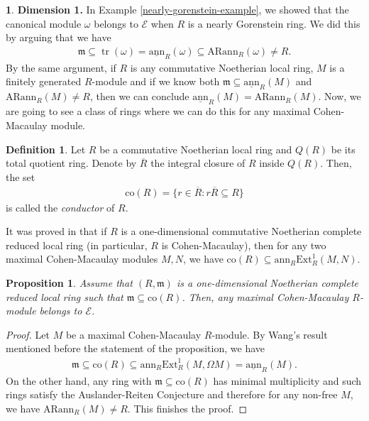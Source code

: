 \documentclass[12pt]{amsart}
\newcommand{\Ext}{\mathrm{Ext}}
\newcommand{\ann}{\mathrm{ann}}
\newcommand{\sann}{\underline{\mathrm{ann}}}
\newcommand{\arann}{\mathrm{ARann}}
\newcommand\co{\mathrm{co}}
\newcommand{\m}{\mathfrak{m}}
\newcommand{\EE}{\mathcal{E}}
\newtheorem{proposition}[theorem]{Proposition}
\theoremstyle{definition}
\newtheorem{definition}[theorem]{Definition}
\newtheorem{chunk}[theorem]{}
\numberwithin{equation}{theorem}
\DeclareMathOperator{\tr}{\mathrm{tr}}
\begin{document}
\begin{chunk}
    \textbf{Dimension 1.} In Example \ref{nearly-gorenstein-example}, we showed that the canonical module $\omega$ belongs to $\EE$ when $R$ is a nearly Gorenstein ring. We did this by arguing that we have 
    \begin{align*}
        \m \subseteq \tr(\omega) = \sann_R(\omega) \subseteq \arann_R(\omega) \neq R.
    \end{align*}
    By the same argument, if $R$ is any commutative Noetherian local ring, $M$ is a finitely generated $R$-module and if we know both $\m \subseteq \sann_R(M)$ and $\arann_R(M) \neq R$, then we can conclude $\sann_R(M) = \arann_R(M)$. Now, we are going to see a class of rings where we can do this for any maximal Cohen-Macaulay module.
    
    \begin{definition}
        Let $R$ be a commutative Noetherian local ring and $Q(R)$ be its total quotient ring. Denote by $\overline{R}$ the integral closure of $R$ inside $Q(R)$. Then, the set 
        \begin{align*}
            \co(R) = \{ r \in \overline{R} \colon r\overline{R} \subseteq R \}
        \end{align*}
    is called the \textit{conductor} of $R$.
    \end{definition}
    It was proved in \cite[Corollary 3.1]{Wang} that if $R$ is a one-dimensional commutative Noetherian complete reduced local ring (in particular, $R$ is Cohen-Macaulay), then for any two maximal Cohen-Macaulay modules $M,N$, we have $\co(R) \subseteq \ann_R\Ext_R^1(M,N)$. 
    \begin{proposition}\label{far-flung-Gorenstein-nearly}
        Assume that $(R, \m)$ is a one-dimensional Noetherian complete reduced local ring such that $\m \subseteq \co(R)$. Then, any maximal Cohen-Macaulay $R$-module belongs to $\EE$.
    \end{proposition}
    \begin{proof}
        Let $M$ be a maximal Cohen-Macaulay $R$-module. By Wang's result mentioned before the statement of the proposition, we have
        \begin{align*}
            \m \subseteq \co(R) \subseteq \ann_R \Ext_R^1(M, \Omega M) = \sann_R(M).
        \end{align*}
        On the other hand, any ring with $\m \subseteq \co(R)$ has minimal multiplicity \cite[Theorem 5.1]{goto-matsuoka-phuong} and such rings satisfy the Auslander-Reiten Conjecture \cite{Dey-Ghosh} and therefore for any non-free $M$, we have $\arann_R(M) \neq R$. This finishes the proof. 

\end{proof}
\end{chunk}
\end{document}
